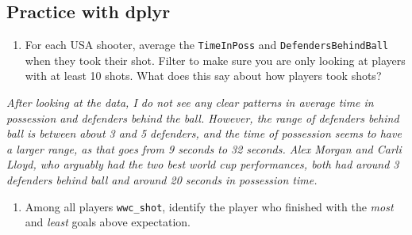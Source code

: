 \documentclass[]{article}
\newenvironment{Shaded}{\begin{snugshade}}{\end{snugshade}}
\newcommand{\DataTypeTok}[1]{\textcolor[rgb]{0.13,0.29,0.53}{#1}}
\newcommand{\DecValTok}[1]{\textcolor[rgb]{0.00,0.00,0.81}{#1}}
\newcommand{\KeywordTok}[1]{\textcolor[rgb]{0.13,0.29,0.53}{\textbf{#1}}}
\newcommand{\NormalTok}[1]{#1}
\newcommand{\OperatorTok}[1]{\textcolor[rgb]{0.81,0.36,0.00}{\textbf{#1}}}
\newcommand{\StringTok}[1]{\textcolor[rgb]{0.31,0.60,0.02}{#1}}
\providecommand{\tightlist}{%
  \setlength{\itemsep}{0pt}\setlength{\parskip}{0pt}}
\begin{document}
\hypertarget{practice-with-dplyr}{%
\subsection{Practice with dplyr}\label{practice-with-dplyr}}

\begin{enumerate}
\def\labelenumi{\arabic{enumi}.}
\setcounter{enumi}{7}
\tightlist
\item
  For each USA shooter, average the \texttt{TimeInPoss} and
  \texttt{DefendersBehindBall} when they took their shot. Filter to make
  sure you are only looking at players with at least 10 shots. What does
  this say about how players took shots?
\end{enumerate}

\begin{Shaded}
\end{Shaded}

\emph{After looking at the data, I do not see any clear patterns in
average time in possession and defenders behind the ball. However, the
range of defenders behind ball is between about 3 and 5 defenders, and
the time of possession seems to have a larger range, as that goes from 9
seconds to 32 seconds. Alex Morgan and Carli Lloyd, who arguably had the
two best world cup performances, both had around 3 defenders behind ball
and around 20 seconds in possession time.}

\begin{enumerate}
\def\labelenumi{\arabic{enumi}.}
\setcounter{enumi}{8}
\tightlist
\item
  Among all players \texttt{wwc\_shot}, identify the player who finished
  with the \emph{most} and \emph{least} goals above expectation.
\end{enumerate}
\end{document}
